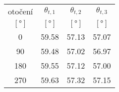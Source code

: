 \begin{tabular}[t]{
  S[table-format=3.0]
  S[table-format=2.2]
  S[table-format=2.2]
  S[table-format=2.2]
} \toprule
{otočení}          & {$\theta_{t,1}$}   & {$\theta_{t,2}$}   & {$\theta_{t,3}$}   \\
{$[\si{\degree}]$} & {$[\si{\degree}]$} & {$[\si{\degree}]$} & {$[\si{\degree}]$} \\                 & 59.58              & 57.13              & 57.07              \\
 90                & 59.48              & 57.02              & 56.97              \\
180                & 59.55              & 57.12              & 57.00              \\
270                & 59.63              & 57.32              & 57.15              \\ \bottomrule
\end{tabular}